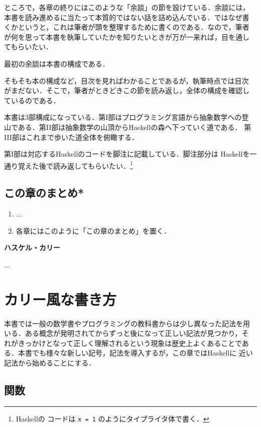 \documentclass[a5paper,twoside,fleqn]{jsbook}
\newcommand{\programminglanguage}[1]{\textsf{#1}}
\newcommand{\haskell}{\programminglanguage{Haskell}}
\newenvironment{leader}{\begingroup\gt}{\endgroup}
\newenvironment{note}[1]{\begin{boxnote}\begin{center}\textbf{#1}\end{center}}{\end{boxnote}}
\newcommand{\code}[1]{\texttt{#1}}
\begin{document}
ところで，各章の終りにはこのような「余談」の節を設けている．余談には，
本書を読み進めるに当たって本質的ではない話を詰め込んでいる．ではなぜ書
くかというと，これは筆者が頭を整理するために書くのである．なので，筆者
が何を思って本書を執筆していたかを知りたいときが万が一来れば，目を通し
てもらいたい．

最初の余談は本書の構成である．

そもそも本の構成など，目次を見ればわかることであるが，執筆時点では目次
がまだない．そこで，筆者がときどきこの節を読み返し，全体の構成を確認し
ているのである．

本書は3部構成になっている．第I部はプログラミング言語から抽象数学への登
山である．第II部は抽象数学の山頂から\haskell の森へ下っていく道である．
第III部はこれまで歩いた道全体を俯瞰する．

第I部は対応する\haskell のコードを脚注に記載している．脚注部分は
\haskell を一通り覚えた後で読み返してもらいたい．\footnote{\haskell の
  コードは \code{x = 1} のようにタイプライタ体で書く．}

\section{この章のまとめ*}

\begin{enumerate}
\item ...  \item 各章にはこのように「この章のまとめ」を置く．
\end{enumerate}


\begin{note}{ハスケル・カリー}
...
\end{note}


\chapter{カリー風な書き方}
\label{ch:curry}

\begin{leader}
本書では一般の数学書やプログラミングの教科書からは少し異なった記法を用
いる．ある概念が発明されてからずっと後になって正しい記法が見つかり，そ
れがきっかけとなって正しく理解されるという現象は歴史上よくあることであ
る．本書でも様々な新しい記号，記法を導入するが，この章では\haskell に
近い記法から始めることにする．
\end{leader}

\section{関数}
\end{document}

